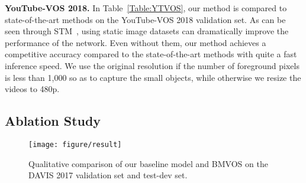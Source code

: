 \documentclass[10pt,twocolumn,letterpaper]{article}
\begin{document}
	
	
	\vspace{1mm} 
	\noindent\textbf{YouTube-VOS 2018.} In Table~\ref{Table:YTVOS}, our method is compared to state-of-the-art methods on the YouTube-VOS 2018 validation set. As can be seen through STM~\cite{STM}, using static image datasets can dramatically improve the performance of the network. Even without them, our method achieves a competitive accuracy compared to the state-of-the-art methods with quite a fast inference speed. We use the original resolution if the number of foreground pixels is less than 1,000 so as to capture the small objects, while otherwise we resize the videos to 480p.
	
	
	\subsection{Ablation Study}
	
	
	\begin{figure*}[t]
		\centering
		\texttt{[image: figure/result]}
		\caption{Qualitative comparison of our baseline model and BMVOS on the DAVIS 2017 validation set and test-dev set.}
		\label{figure6}
	\end{figure*}
	
	
	
\end{document}
